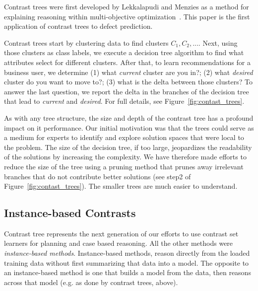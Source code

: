 \documentclass[conference]{IEEEtran}
\newcommand{\fig}[1]{Figure~\ref{fig:#1}}
\begin{document}
Contrast trees were first developed by Lekkalapudi and Menzies as a method
for explaining reasoning within multi-objective optimization~\cite{nva14}. This paper is the first
application of contrast trees to defect prediction.

	Contrast trees start by clustering data to find clusters $C_1,C_2,...$.
	Next, using those clusters as class labels, we execute a decision tree algorithm to find what attributes select for different clusters. After that, to learn recommendations for a business user, we determine (1) what {\em current} cluster are you in?; (2) what {\em desired} cluster do you want to move to?; (3) what is the delta between those clusters? To answer the last question, we report the delta in the branches of the decision tree that lead to {\em current} and {\em desired}.  For full details, see \fig{contast_trees}.
	
 
 
	

As with any tree structure, the size and depth of the contrast tree has a profound impact on it performance. Our initial motivation was that the trees could serve as a medium for experts to identify and explore solution spaces that were local to the problem. The size of the decision tree, if too large, jeopardizes the readability of the solutions by increasing the complexity. We have therefore made efforts to reduce the size of the tree using  a pruning method that prunes away irrelevant branches that do not contribute better solutions (see step2 of \fig{contast_trees}). The smaller trees are much easier to understand.



	\subsection{Instance-based Contrasts}
	Contrast tree represents the next generation of our efforts to use contrast set learners for planning and case based reasoning. All the other methods were {\em instance-based methods}. 
	Instance-based methods,   reason directly
	from the loaded training data without first summarizing that data into a model.
	The opposite to an instance-based method is one that builds
	a model from the data, then reasons across that model (e.g. as done by
	contrast trees, above). 
	
\end{document}
